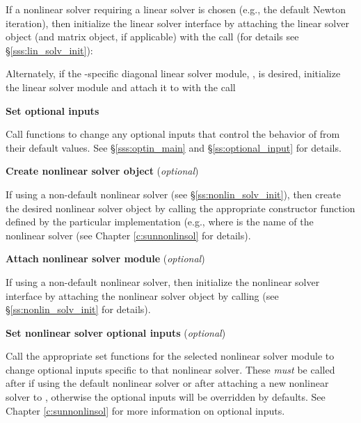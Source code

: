 \begin{Steps}
  If a nonlinear solver requiring a linear solver is chosen (e.g., the default
  Newton iteration), then initialize the {\cvls} linear solver
  interface by attaching the linear solver object (and matrix object, if
  applicable) with the call (for details see
  \S\ref{sss:lin_solv_init}):


  Alternately, if the {\cvode}-specific diagonal linear solver module,
  {\cvdiag}, is desired, initialize the linear solver module and
  attach it to {\cvode} with the call


\item
  {\bf Set optional inputs}

  Call  functions to change any
  optional inputs that control the behavior of {\cvode} from their default values.
  See \S\ref{sss:optin_main} and \S\ref{ss:optional_input} for details.

\item\label{i:nonlin_solver}
  {\bf Create nonlinear solver object} (\textit{optional})

  If using a non-default nonlinear solver (see \S\ref{ss:nonlin_solv_init}),
  then create the desired nonlinear solver object by calling the appropriate
  constructor function defined by the particular {\sunnonlinsol} implementation
  (e.g.,  where \id{***} is the name of the
  nonlinear solver (see Chapter \ref{c:sunnonlinsol} for details).

\item\label{i:nonlin_solver_interface}
  {\bf Attach nonlinear solver module} (\textit{optional})

  If using a non-default nonlinear solver, then initialize the nonlinear solver
  interface by attaching the nonlinear solver object by calling
   (see
  \S\ref{ss:nonlin_solv_init} for details).

\item
  {\bf Set nonlinear solver optional inputs} (\textit{optional})

  Call the appropriate set functions for the selected nonlinear solver module to
  change optional inputs specific to that nonlinear solver. These \textit{must}
  be called after  if using the default nonlinear solver or after
  attaching a new nonlinear solver to {\cvode}, otherwise the optional inputs
  will be overridden by {\cvode} defaults. See Chapter \ref{c:sunnonlinsol} for
  more information on optional inputs.


\end{Steps}
